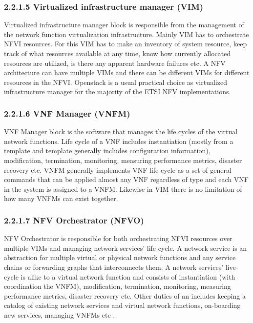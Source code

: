 \documentclass[12pt,oneandhalf,chaparabic,ceng,ms,eng,oneside,pntc]{gsufbe}
\begin{document}
\subsubsection[Virtualized infrastructure manager (VIM)]{2.2.1.5 Virtualized infrastructure manager (VIM)}
Virtualized infrastructure manager block is responsible from the management of the network function
virtualization infrastructure.  Mainly VIM has to orchestrate NFVI resources.  For this VIM has to make
an inventory of system resource, keep track of what resources available at any time, know how currently
allocated resources are utilized, is there any apparent hardware failures etc.
A NFV architecture can have multiple VIMs and there can be different VIMs for different resources in 
the NFVI.  Openstack is a usual practical choice as virtualized infrastructure manager for the majority
of the ETSI NFV implementations.

\subsubsection[VNF Manager (VNFM)]{2.2.1.6 VNF Manager (VNFM)}
VNF Manager block is the software that manages the life cycles of the virtual network functions.  Life
cycle of a VNF includes instantiation (mostly from a template and template generally includes
configuration information), modification, termination, monitoring, measuring performance metrics,
disaster recovery etc.  VNFM generally implements VNF life cycle as a set of general commands that can
be applied almost any VNF regardless of type and each VNF in the system is assigned to a VNFM.
Likewise in VIM there is no limitation of how many VNFMs can exist together.

\subsubsection[NFV Orchestrator (NFVO)]{2.2.1.7 NFV Orchestrator (NFVO)}
NFV Orchestrator is responsible for both orchestrating NFVI resources over multiple VIMs and managing
network services' life cycle.  A network service is an abstraction for multiple virtual or physical
network functions and any service chains or forwarding graphs that interconnects them.  A network
services' live-cycle is alike to a virtual network function and consists of instantiation (with
coordination the VNFM), modification, termination, monitoring, measuring performance metrics, disaster
recovery etc.  Other duties of an includes keeping a catalog of existing network services and virtual
network functions, on-boarding new services, managing VNFMs etc \cite{gonzalez_dependability_2018}.
\end{document}

